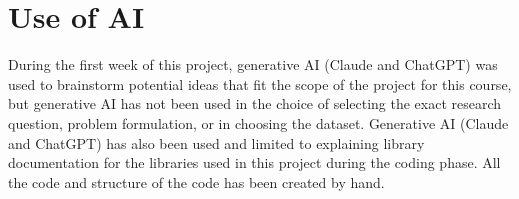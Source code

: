 \documentclass{article}
\begin{document}













\section{Use of AI}





During the first week of this project, generative AI (Claude and ChatGPT) was used to brainstorm potential ideas that fit the scope of the project for this course, but generative AI has not been used in the choice of selecting the exact research question, problem formulation, or in choosing the dataset. Generative AI (Claude and ChatGPT) has also been used and limited to explaining library documentation for the libraries used in this project during the coding phase. All the code and structure of the code has been created by hand.
\end{document}
